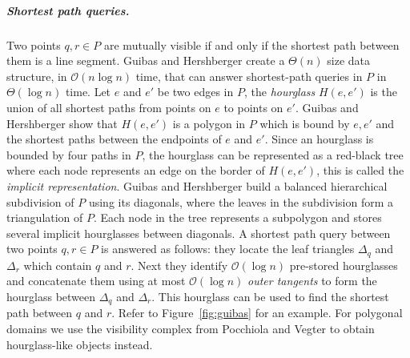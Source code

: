 \documentclass[a4paper, UKenglish]{lipics-v2018}
\begin{document}
\subparagraph{Shortest path queries.}
Two points $q,r \in P$ are mutually visible if and only if the shortest path between them is a line segment.  Guibas and Hershberger \cite{guibas1989optimal} create a $\Theta(n)$ size data structure, in $\mathcal{O}(n \log n)$ time, that can answer shortest-path queries in $P$ in $\Theta(\log n)$ time. Let $e$ and $e'$ be two edges in $P$, the \emph{hourglass} $H(e, e')$ is the union of all shortest paths from points on $e$ to points on $e'$. Guibas and Hershberger show that $H(e, e')$ is a polygon in $P$ which is bound by $e, e'$ and the shortest paths between the endpoints of $e$ and $e'$. Since an hourglass is bounded by four paths in $P$, the hourglass can be represented as a red-black tree where each node represents an edge on the border of $H(e, e')$, this is called the \emph{implicit representation}. 
Guibas and Hershberger build a balanced hierarchical subdivision of $P$ using its diagonals, where the leaves in the subdivision form a triangulation of $P$. Each node in the tree represents a subpolygon and stores several implicit hourglasses between diagonals. A shortest path query between two points $q,r \in P$ is answered as follows: they locate the leaf triangles $\Delta_q$ and $\Delta_r$ which contain $q$ and $r$. Next they identify  $\mathcal{O}(\log n)$ pre-stored hourglasses and concatenate them using at most $\mathcal{O}(\log n)$ \emph{outer tangents} to form the hourglass between $\Delta_q$ and $\Delta_r$. This hourglass can be used to find the shortest path between $q$ and $r$. Refer to Figure~\ref{fig:guibas} for an example. For polygonal domains we use the visibility complex from Pocchiola and Vegter \cite{pocchiola1996visibility} to obtain hourglass-like objects instead.
\end{document}

